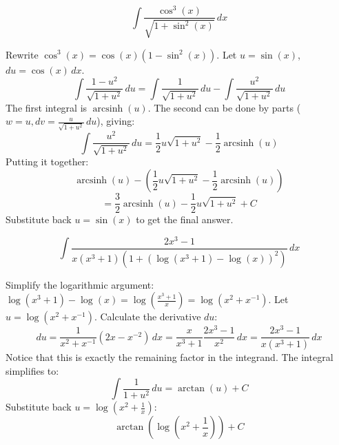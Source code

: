 \begin{questions}
    \question \[\int \frac{\cos^3(x)}{\sqrt{1 + \sin^2(x)}} \,dx\]
    \begin{solution}
        Rewrite $\cos^3(x) = \cos(x)(1 - \sin^2(x))$. Let $u = \sin(x)$, $du = \cos(x)\,dx$.
        \[\int \frac{1 - u^2}{\sqrt{1+u^2}} \,du = \int \frac{1}{\sqrt{1+u^2}} \,du - \int \frac{u^2}{\sqrt{1+u^2}} \,du\]
        The first integral is $\operatorname{arcsinh}(u)$. The second can be done by parts ($w = u, dv = \frac{u}{\sqrt{1+u^2}}\,du$), giving:
        \[\int \frac{u^2}{\sqrt{1+u^2}} \,du = \frac{1}{2}u\sqrt{1+u^2} - \frac{1}{2}\operatorname{arcsinh}(u)\]
        Putting it together:
        \[\operatorname{arcsinh}(u) - \left( \frac{1}{2}u\sqrt{1+u^2} - \frac{1}{2}\operatorname{arcsinh}(u) \right)\]
        \[= \frac{3}{2}\operatorname{arcsinh}(u) - \frac{1}{2}u\sqrt{1+u^2} + C\]
        Substitute back $u = \sin(x)$ to get the final answer.
    \end{solution}

    \question \[\int \frac{2x^3 - 1}{x(x^3 + 1)(1 + (\log(x^3 + 1) - \log(x))^2)} \,dx\]
    \begin{solution}
        Simplify the logarithmic argument: $\log(x^3 + 1) - \log(x) = \log\left(\frac{x^3+1}{x}\right) = \log(x^2 + x^{-1})$.
        Let $u = \log(x^2 + x^{-1})$. Calculate the derivative $du$:
        \[du = \frac{1}{x^2 + x^{-1}} (2x - x^{-2}) \,dx = \frac{x}{x^3+1} \frac{2x^3 - 1}{x^2} \,dx = \frac{2x^3 - 1}{x(x^3+1)} \,dx\]
        Notice that this is exactly the remaining factor in the integrand. The integral simplifies to:
        \[\int \frac{1}{1+u^2} \,du = \arctan(u) + C\]
        Substitute back $u = \log(x^2 + \frac{1}{x})$:
        \[\arctan\left(\log\left(x^2 + \frac{1}{x}\right)\right) + C\]
    \end{solution}
\end{questions}

